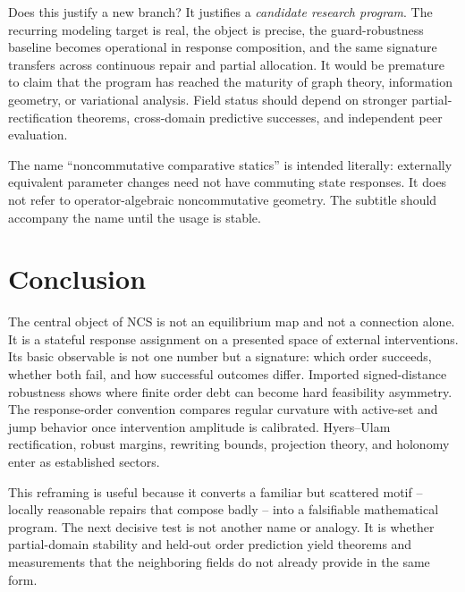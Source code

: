 \documentclass[11pt]{article}
\theoremstyle{definition}
\theoremstyle{remark}
\begin{document}
Does this justify a new branch? It justifies a \emph{candidate research
program}. The recurring modeling target is real, the object is precise, the
guard-robustness baseline becomes operational in response composition, and
the same signature transfers across continuous repair and partial allocation.
It would be premature to claim that the program has reached the maturity of
graph theory, information geometry, or variational analysis. Field status
should depend on stronger partial-rectification theorems, cross-domain
predictive successes, and independent peer evaluation.

The name ``noncommutative comparative statics'' is intended literally:
externally equivalent parameter changes need not have commuting state
responses. It does not refer to operator-algebraic noncommutative geometry.
The subtitle should accompany the name until the usage is stable.

\section{Conclusion}

The central object of NCS is not an equilibrium map and not a connection
alone. It is a stateful response assignment on a presented space of external
interventions. Its basic observable is not one number but a signature:
which order succeeds, whether both fail, and how successful outcomes differ.
Imported signed-distance robustness shows where finite order debt can become
hard feasibility asymmetry. The response-order convention compares regular
curvature with active-set and jump behavior once intervention amplitude is
calibrated. Hyers--Ulam rectification, robust margins, rewriting bounds,
projection theory, and holonomy enter as established sectors.

This reframing is useful because it converts a familiar but scattered motif
-- locally reasonable repairs that compose badly -- into a falsifiable
mathematical program. The next decisive test is not another name or analogy.
It is whether partial-domain stability and held-out order prediction yield
theorems and measurements that the neighboring fields do not already provide
in the same form.



\end{document}
